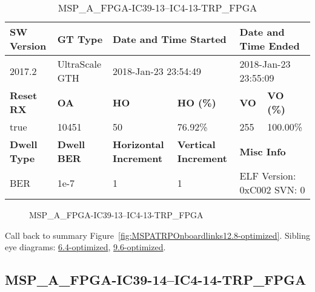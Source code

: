 \begin{table}[h]
\centering
\caption{MSP\_A\_FPGA-IC39-13--IC4-13-TRP\_FPGA}
\label{tab:MSPAFPGAIC3913IC413TRPFPGA12.8-optimized}
\begin{tabular}{@{}|l|l|l|l|l|l|@{}}
\toprule
\textbf{SW Version}                & \textbf{GT Type}   & \multicolumn{2}{l|}{\textbf{Date and Time Started}}            & \multicolumn{2}{l|}{\textbf{Date and Time Ended}}        \\ \midrule
2017.2                       & UltraScale GTH          & \multicolumn{2}{l|}{2018-Jan-23 23:54:49}                   & \multicolumn{2}{l|}{2018-Jan-23 23:55:09}               \\ \midrule
\textbf{Reset RX}                  & \textbf{OA} & \textbf{HO}   & \textbf{HO (\%)} & \textbf{VO} & \textbf{VO (\%)} \\ \midrule
true & 10451        & 50          & 76.92\%        & 255        & 100.00\%       \\ \midrule
\textbf{Dwell Type}                & \textbf{Dwell BER} & \textbf{Horizontal Increment} & \textbf{Vertical Increment}    & \multicolumn{2}{l|}{\textbf{Misc Info}}                  \\ \midrule
BER                            & 1e-7        & 1        & 1           & \multicolumn{2}{l|}{ELF Version: 0xC002 SVN: 0}                         \\ \bottomrule
\end{tabular}
\end{table}

\begin{figure}[h]
\caption{MSP\_A\_FPGA-IC39-13--IC4-13-TRP\_FPGA} \label{fig:MSPAFPGAIC3913IC413TRPFPGA12.8-optimized}
\end{figure}

Call back to summary Figure~\ref{fig:MSPATRPOnboardlinks12.8-optimized}.
Sibling eye diagrams: \hyperref[sec:MSPAFPGAIC3913IC413TRPFPGA6.4-optimized]{6.4-optimized}, \hyperref[sec:MSPAFPGAIC3913IC413TRPFPGA9.6-optimized]{9.6-optimized}.

\clearpage
\newpage


\subsection{MSP\_A\_FPGA-IC39-14--IC4-14-TRP\_FPGA}\label{sec:MSPAFPGAIC3914IC414TRPFPGA12.8-optimized}

